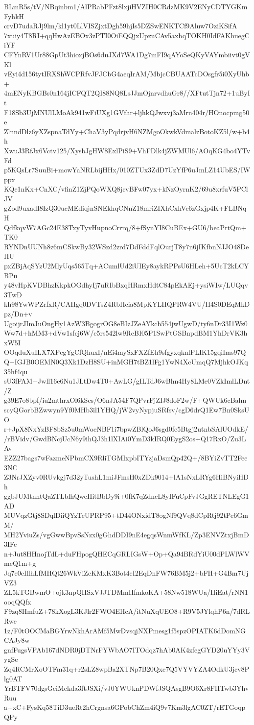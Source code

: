BLmR5s/tV/NBqinbm1/AlPRabPFzt8lxjiHVZIH0CRdzMK9V2ENyCDTYGKmFyhkH
crvD7udaRJj9lm/kl1yt0LlVISZjxtDgh59hjIs5DZSwENKTCf9Aluw7OziKSifA
7xuiy4T8RI+qqHwAzEBOx3zPTI0OiEQQjxUpzuCAv5axbqTOKH0IdFAKhuegCiYF
CFYnRV1Ur88GpUt3hioxjBOs6duJXd7WA1Dg7mFI9qAYoSeQKyVAYmbiivt0gVKl
vEyi4d156tytIRXShWCPRfvJFJCbG4aeqIrAM/MbjcCBUAATcDOsgfr5i0XyUhb+
4mENyKBGBs0n164jICFQT2QI88NQ8LsJJmOjnrvdhuGr8//XFtutTjn72+1uByIt
F18Sb3UjMNUlLMoAk941wFiUXg1GVfhr+ljhkQJwxvj3aMrn404r/HOnocpmg50e
ZlnndDlz6yXZspnaTdYy+ChaV3yPqdrjvH6NZMgoOkwkVdmalzBotoKZ5l/w+b4h
XwuJ3RfJx6Vctv125/XysbJgHW8ExlPiS9+VhFDlk4jZWMUl6/AOqKG4bo4YTvFd
p5KQsLr7SuuBi+mowYaNRLbijHHx/010ZTUx3ZdD7UzYfP6uJmLZ14UbES/IWppx
KQe1nKx+CnXC/vfinZ1ZjPQoWXQ8jcvBFw07yx+kNzOyrnK2/69u8xrfuV5PClJV
gZod9uxadI8IzQ30ucMEdiqjnSNEkhqCNnZ18mriZIXhCxhVc6zGxjp4K+FLBNqH
QdfkqvW7AGc24E38TxyTyvHupnoCrrrq/8+fSynYI8CuBEx+GU6/beaPrtQm+TK0
RYNDnUUNh8z6mCSkwBy32WSzd2zrd7DdFddFqlOurjT8y7n6jIKfbnNJJO48DeHU
pxZBjAqSYzU2MlyUqs565Tq+ACumlUd2iUIEy8aykRPPsU6HLeh+5UcT2kLCYBPu
y48vHpKVDBhzKkpkOGdhyIj7uRIbBxqHRmxHdtC84pEkAEj+ysiWIw/LUQqv3TwD
kh98YwWPZrfxR/CAHgq0DVTsZ4RbHcia8MpKYLHQPRW4VU/H4S0DEqMkDpz/Dn+v
UgoijrJImJuOngHy1AzW3BgogrOG8eBIzJZeAYkcb554jwUgwD/ty6nDr33I1Wz0
Ww7d+hMM3+dVw1sfcj6W/e5rs542lw9ReBI05P1SwPtGSBnpdBM1YhDrVK3hxW5I
OOqduXuILX7XPcgYgCfQhuxI/nEi4mySxFXZfEh9sfgyxqknlPLIK15gqiIms97Q
Q+IGJB0OEMN0Q3Xk1DzH8SU+inMGH7tBZ1lFg1YwN4XcUmqQ7MjhkOJKq35hf4qu
sU3fFAM+Jwll16e6Nu1JLtDw4T0+AwLG/gILTdJ6wBhn4Hy8LMe0VZkImlLDnt/Z
g39E7o8bpf/iu2mthrxOl6kScs/O6nJA54F7QPvrFjZIJ8doF2w/F+QWUk6cBalm
scyQGorbBZwwyn9Yf0MHb3il1YHQ/jW2vyNypjuSRfsv/cgD6drQ1Ew7Bn0SksUO
r+JpX8NxYzBF8bSz5u0mWoeNBF1i7bpwZBlQoJ6sgd0fe5Btgj2utnbSAlUOdkE/
/rBVidv/GwdBNcjUcN6y9ihQJ3h1lXIAi0YmD3kIRQ0EygS2os+Q17RxO/Zu3LAv
EZZ27bags7wFazmeNPbmCX9RliTGMIxpbITYzjaDsmQp42Q+/8BYiZvTT2Fee3NC
Z3NrJXZyv0RUvkgj7d32yTushL1miJFmsH0xZDk9014+lA1sNxLRYg6HiBNyiHDh
ggbJUMtnntQaZTLblhQweHitBbDy9i+0fK7qZdneL8yIFuCpFvJGgRETNLEgG1AD
MUVqzGtj8SDqlDiiQYzTeUPRP95+tD44ONxidT8ogNf9QVq8dCpRtj92tPe6GmM/
MH2YviuZs/vgGwwBpvSsNzx0gGhdDDI9nE4egqsWnmWfKL/Zp3ENVZtxjBmD3IFc
n+Jut8HHnojTdL+duFHpogQHECqGRLIGsW+Op+Qa94BRdYiU00dPLWlWVmeQ1m+g
Jq7e0cIflhLfMHQt26WkViZeKMxK3Bot4eI2EqDnFW76BM5j2+bFH+G4Bm7UjVZ3
ZL5kTGBwmO+ojk3npQHSxVJJTDMmHfmkoKA+58Nw518WUa/HiEat/rNN1ooqQQfx
F9zq8HmfuZ+78kXogL3KJlr2FWO4EHcA/itNuXqUEO8+R9V5JYlqhP6n/7dRLRwe
1z/F0tOOCMaBGYrwNkhArAMf5MwDvsqjNXPmesg1f5spzOPIATK6dDomNGCAJy8w
gnfFugsVPAb167dNDR0jDTNrFYWbAO7ITOdqz7hAb0AK4zfegGYD20uYYy3VygSe
Zq4RCMrXoOTFm31q+r2sLZ8wpBa2XTNp7B20Qxe7Q5VYVYZA4OdkU3jcv8Plg0AT
YrBTFV70dgsGciMekda3ftJSXi/vJ0YWUknPDWfJSQAsgB9O6Xr8FHTwb3YhvRuu
a+xC+FysKq58TiD3ueRt2hCrgnsa6GPobChZm4iQ9v7Km3lgAC0ZT/rETGoqpQPy
